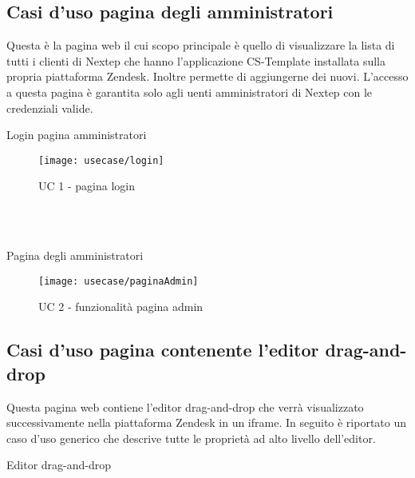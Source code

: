\subsection{ Casi d'uso pagina degli amministratori}
Questa è la pagina web il cui scopo principale è quello di visualizzare la lista di tutti i clienti di Nextep che hanno l'applicazione CS-Template installata sulla propria piattaforma Zendesk. Inoltre permette di aggiungerne dei nuovi. L'accesso a questa pagina è garantita solo agli uenti amministratori di Nextep con le credenziali valide.
\begin{usecase}{1}{Login pagina amministratori}

		\begin{figure}[!h] 
		\centering 
		\texttt{[image: usecase/login]} 
		\caption{UC 1 - pagina login}
	\end{figure}
\\ 
\\
\begin{usecase}{2}{Pagina degli amministratori}
	
	\begin{figure}[!h] 
		\centering 
		\texttt{[image: usecase/paginaAdmin]} 
		\caption{UC 2 - funzionalità pagina admin}
	\end{figure}
\end{usecase}
\newpage
\subsection{ Casi d'uso pagina contenente l'editor drag-and-drop}
Questa pagina web contiene l'editor drag-and-drop che verrà visualizzato successivamente nella piattaforma Zendesk in un iframe. In seguito è riportato un caso d'uso generico che descrive tutte le proprietà ad alto livello dell'editor.
\begin{usecase}{3}{Editor drag-and-drop}
	

\end{usecase}
\end{usecase}

